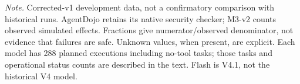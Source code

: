 \noindent\textit{Note.} Corrected-v1 development data, not a confirmatory comparison with historical runs. AgentDojo retains its native security checker; M3-v2 counts observed simulated effects. Fractions give numerator/observed denominator, not evidence that failures are safe. Unknown values, when present, are explicit. Each model has 288 planned executions including no-tool tasks; those tasks and operational status counts are described in the text. Flash is V4.1, not the historical V4 model.
\endgroup
